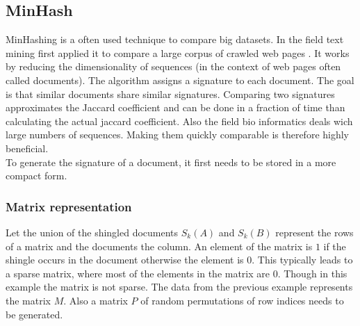 \subsection{MinHash}
\label{ssec:minhash}

MinHashing is a often used technique to compare big datasets. In the field text mining \citeauthor{minhash} first applied it to compare a large corpus of crawled web pages \cite{minhash}. It works by reducing the dimensionality of sequences (in the context of web pages often called documents). The algorithm assigns a signature to each document. The goal is that similar documents share similar signatures. Comparing two signatures approximates the Jaccard coefficient and can be done in a fraction of time than calculating the actual jaccard coefficient. Also the field bio informatics deals wich large numbers of sequences. Making them quickly comparable is therefore highly beneficial. \\

To generate the signature of a document, it first needs to be stored in a more compact form.

\subsubsection{Matrix representation}

Let the union of the shingled documents $ S_k(A) $ and $ S_k(B) $ represent the rows of a matrix and the documents the column. An element of the matrix is $ 1 $ if the shingle occurs in the document otherwise the element is $ 0 $. This typically leads to a sparse matrix, where most of the elements in the matrix are $ 0 $. Though in this example the matrix is not sparse. The data from the previous example represents the matrix $ M $. Also a matrix $ P $ of random permutations of row indices needs to be generated.\\


